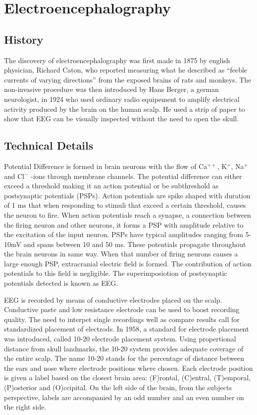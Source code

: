 \documentclass[12pt, a4paper, fleqn]{memoir}%
\begin{document}
\section{Electroencephalography}
\label{sec:Electroencephalography}

\subsection{History}
The discovery of electroencephalography was first made in 1875 by english physician, Richard Caton, who reported measuring what he described as ``feeble currents of varying directions'' from the exposed brains of rats and monkeys. The non-invasive procedure was then introduced by Hans Berger, a german neurologist, in 1924 who used ordinary radio equipement to amplify electrical activity produced by the brain on the human scalp. He used a strip of paper to show that EEG can be visually inspected without the need to open the skull.

\subsection{Technical Details}
Potential Difference is formed in brain neurons with the flow of Ca$^{++}$, K$^{+}$, Na$^{+}$ and Cl$^{-}$ -ions through membrane channels. The potential difference can either exceed a threshold making it an action potential or be subthreshold as postsynaptic potentials (PSPs). Action potentials are spike shaped with duration of 1 ms that when responding to stimuli that exceed a certain threshold, causes the neuron to fire. When action potentials reach a synapse, a connection between the firing neuron and other neurons, it forms a PSP with amplitude relative to the excitation of the input neuron. PSPs have typical amplitudes ranging from 5-10mV and spans between 10 and 50 ms. These potentials propagate throughout the brain neurons in same way. When that number of firing neurons causes a large enough PSP, extracranial electric field is formed. The contribution of action potentials to this field is negligible. The superimposiotion of postsynaptic potentials detected is known as EEG.

EEG is recorded by means of conductive electrodes placed on the scalp. Conductive paste and low resistance electrode can be used to boost recording quality. The need to interpet single recordings well as compare results call for standardized placement of electrods. In 1958, a standard for electrode placement was introduced, called 10-20 electrode placement system. Using propertional distance from skull landmarks, the 10-20 system provides adequate coverage of the entire scalp. The name 10-20 stands for the percentage of distance between the ears and nose where electrode positions where chosen. Each electrode position is given a label based on the closest brain area: (F)rontal, (C)entral, (T)emporal, (P)osterior and (O)ccipital. On the left side of the brain, from the subjects perspective, labels are accompanied by an odd number and an even number on the right side.
\end{document}
